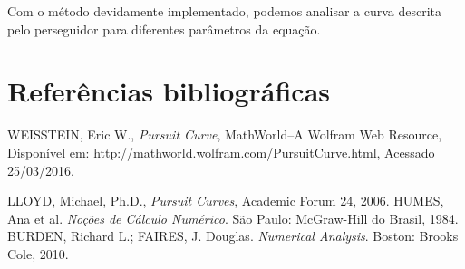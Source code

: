 \documentclass[a4paper,10pt]{article}
\begin{document}
  Com o método devidamente implementado, podemos analisar a curva descrita pelo perseguidor para diferentes parâmetros da equação.

  
  \section{Referências bibliográficas}
  

  \begin{thebibliography}{9}
      WEISSTEIN, Eric W.,
      \emph{Pursuit Curve},
      MathWorld--A Wolfram Web Resource,
      Disponível em: http://mathworld.wolfram.com/PursuitCurve.html,
      Acessado 25/03/2016.

      LLOYD, Michael, Ph.D.,
      \emph{Pursuit Curves},
      Academic Forum 24,
      2006.
      HUMES, Ana et al. \emph{Noções de Cálculo Numérico}. São Paulo: McGraw-Hill do Brasil, 1984.
      BURDEN, Richard L.; FAIRES, J. Douglas. \emph{Numerical Analysis}. Boston: Brooks Cole, 2010.  
     
     
     

  \end{thebibliography}
\end{document}
